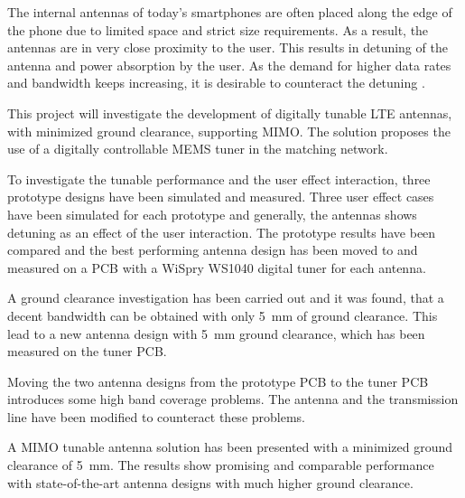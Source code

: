 The internal antennas of today's smartphones are often placed along the edge of the phone due to limited space and strict size requirements. As a result, the antennas are in very close proximity to the user. This results in detuning of the antenna and power absorption by the user. As the demand for higher data rates and bandwidth keeps increasing, it is desirable to counteract the detuning \cite{hilbert2015tradeoff}.    

This project will investigate the development of digitally tunable LTE antennas, with minimized ground clearance, supporting MIMO.
The solution proposes the use of a digitally controllable MEMS tuner in the matching network.


To investigate the tunable performance and the user effect interaction, three prototype designs have been simulated and measured. Three user effect cases have been simulated for each prototype and generally, the antennas shows detuning as an effect of the user interaction. 
The prototype results have been compared and the best performing antenna design has been moved to and measured on a PCB with a WiSpry WS1040 digital tuner for each antenna.

A ground clearance investigation has been carried out and it was found, that a decent bandwidth can be obtained with only \SI{5}{mm} of ground clearance. This lead to a new antenna design with \SI{5}{mm} ground clearance, which has been measured on the tuner PCB.

Moving the two antenna designs from the prototype PCB to the tuner PCB introduces some high band coverage problems. The antenna and the transmission line have been modified to counteract these problems.  

A MIMO tunable antenna solution has been presented with a minimized ground clearance of \SI{5}{mm}. The results show promising and comparable performance with state-of-the-art antenna designs with much higher ground clearance.
